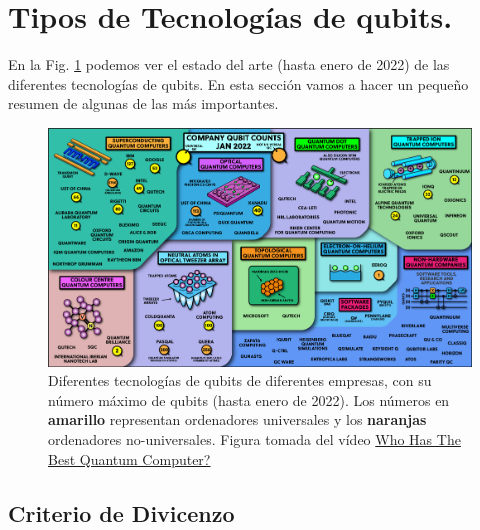 \section{Tipos de Tecnologías de qubits.}



En la Fig. \ref{Fig_Hardware_qubit_tecnologies} podemos ver el estado del arte (hasta enero de 2022) de las diferentes tecnologías de qubits. En esta sección vamos a hacer un pequeño resumen de algunas de las más importantes. 

	\begin{figure}[H]
	\centering 
	\includegraphics[width=1\linewidth]{Figuras/Fig_Hardware_qubit_tecnologies.png}
	\caption{Diferentes tecnologías de qubits de diferentes empresas, con su número máximo de qubits (hasta enero de 2022). Los números en \textbf{amarillo} representan ordenadores universales y los \textbf{naranjas} ordenadores no-universales. Figura tomada del vídeo \href{https://www.youtube.com/watch?v=gcbMKt079l8}{Who Has The Best Quantum Computer?} }
	\label{Fig_Hardware_qubit_tecnologies}
	\end{figure}


	\subsection{Criterio de Divicenzo} \label{sec_criterio_divicenzo}

